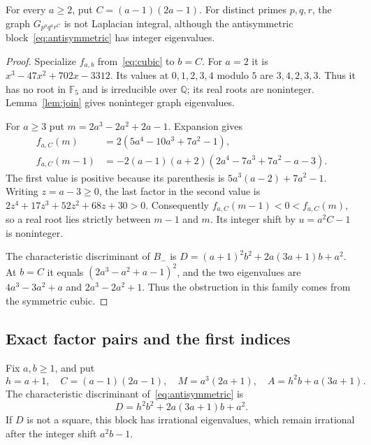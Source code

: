\begin{theorem}
\label{thm:boundary}
For every $a\geq2$, put $C=(a-1)(2a-1)$. For distinct primes $p,q,r$,
the graph $G_{p^a q^a r^C}$ is not Laplacian integral, although the
antisymmetric block~\eqref{eq:antisymmetric} has integer eigenvalues.
\end{theorem}
\begin{proof}
Specialize $f_{a,b}$ from~\eqref{eq:cubic} to $b=C$.
For $a=2$ it is $x^3-47x^2+702x-3312$. Its values at
$0,1,2,3,4$ modulo $5$ are $3,4,2,3,3$. Thus it has no root in
$\mathbb F_5$ and is irreducible over $\mathbb Q$; its real roots
are noninteger. Lemma~\ref{lem:join} gives noninteger graph eigenvalues.

For $a\geq3$ put $m=2a^3-2a^2+2a-1$. Expansion gives
\begin{align*}
f_{a,C}(m)&=2(5a^4-10a^3+7a^2-1),\\
f_{a,C}(m-1)&=-2(a-1)(a+2)(2a^4-7a^3+7a^2-a-3).
\end{align*}
The first value is positive because its parenthesis is
$5a^3(a-2)+7a^2-1$. Writing $z=a-3\geq0$, the last factor in the
second value is
$2z^4+17z^3+52z^2+68z+30>0$.
Consequently $f_{a,C}(m-1)<0<f_{a,C}(m)$, so a real root lies strictly
between $m-1$ and $m$. Its integer shift by $u=a^2C-1$ is noninteger.

The characteristic discriminant of $B_-$ is
$D=(a+1)^2b^2+2a(3a+1)b+a^2$.
At $b=C$ it equals $(2a^3-a^2+a-1)^2$, and the two eigenvalues are
$4a^3-3a^2+a$ and $2a^3-2a^2+1$. Thus the obstruction in this family
comes from the symmetric cubic.
\end{proof}
\subsection{Exact factor pairs and the first indices}

Fix $a,b\geq1$, and put
\[
h=a+1,\quad C=(a-1)(2a-1),\quad M=a^3(2a+1),\quad
A=h^2b+a(3a+1).
\]
The characteristic discriminant of~\eqref{eq:antisymmetric} is
\begin{equation}
\label{eq:discriminant}
D=h^2b^2+2a(3a+1)b+a^2.
\end{equation}
If $D$ is not a square, this block has irrational eigenvalues, which
remain irrational after the integer shift $a^2b-1$.

